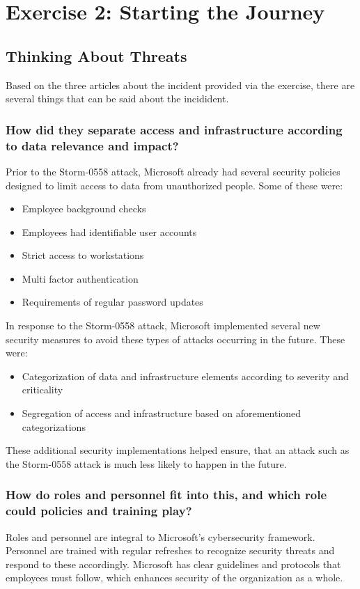 \section{Exercise 2: Starting the Journey}
\subsection{Thinking About Threats}
Based on the three articles about the incident provided via the exercise, there are several things that can be said about the incidident.
\subsubsection{How did they separate access and infrastructure according to data relevance and impact?}
Prior to the Storm-0558 attack, Microsoft already had several security policies designed to limit access to data from unauthorized people. Some of these were:

\begin{itemize}
    \item Employee background checks
    \item Employees had identifiable user accounts
    \item Strict access to workstations
    \item Multi factor authentication
    \item Requirements of regular password updates
\end{itemize}

In response to the Storm-0558 attack, Microsoft implemented several new security measures to avoid these types of attacks occurring in the future. These were:

\begin{itemize}
    \item Categorization of data and infrastructure elements according to severity and criticality
    \item Segregation of access and infrastructure based on aforementioned categorizations
\end{itemize}

These additional security implementations helped ensure, that an attack such as the Storm-0558 attack is much less likely to happen in the future.

\subsubsection{How do roles and personnel fit into this, and which role could policies and training play?}
Roles and personnel are integral to Microsoft's cybersecurity framework. Personnel are trained with regular refreshes to recognize security threats and respond to these accordingly. Microsoft has clear guidelines and protocols that employees must follow, which enhances security of the organization as a whole.

